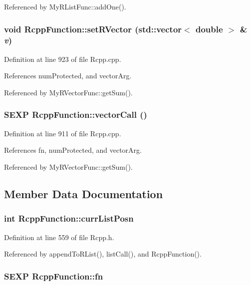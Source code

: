 Referenced by MyRListFunc::addOne().\hypertarget{classRcppFunction_a482df5aa5e2a98d52c9a79cf3ab31c67}{
\subsubsection[{setRVector}]{\setlength{\rightskip}{0pt plus 5cm}void RcppFunction::setRVector (std::vector$<$ double $>$ \& {\em v})}}
\label{classRcppFunction_a482df5aa5e2a98d52c9a79cf3ab31c67}


Definition at line 923 of file Rcpp.cpp.

References numProtected, and vectorArg.

Referenced by MyRVectorFunc::getSum().\hypertarget{classRcppFunction_ac57c514c761609892ff553434e134446}{
\subsubsection[{vectorCall}]{\setlength{\rightskip}{0pt plus 5cm}SEXP RcppFunction::vectorCall ()}}
\label{classRcppFunction_ac57c514c761609892ff553434e134446}


Definition at line 911 of file Rcpp.cpp.

References fn, numProtected, and vectorArg.

Referenced by MyRVectorFunc::getSum().

\subsection{Member Data Documentation}
\hypertarget{classRcppFunction_ace513a92e96b36883b709b5352ea5663}{
\subsubsection[{currListPosn}]{\setlength{\rightskip}{0pt plus 5cm}int {\bf RcppFunction::currListPosn}}}
\label{classRcppFunction_ace513a92e96b36883b709b5352ea5663}


Definition at line 559 of file Rcpp.h.

Referenced by appendToRList(), listCall(), and RcppFunction().\hypertarget{classRcppFunction_aa6b5966224b8b7d158be6cdfc3612063}{
\subsubsection[{fn}]{\setlength{\rightskip}{0pt plus 5cm}SEXP {\bf RcppFunction::fn}}}
\label{classRcppFunction_aa6b5966224b8b7d158be6cdfc3612063}


